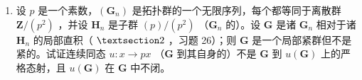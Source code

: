\begin{enumerate}
\def\labelenumi{\arabic{enumi})}
\setcounter{enumi}{22}
\tightlist
\item
  设 \(p\) 是一个素数，\((\mathbf{G}_n)\) 是拓扑群的一个无限序列，每个都等同于离散群 \(\mathbf{Z}/(p^2)\) ，并设 \(\mathbf{H}_n\) 是子群 \((p) / (p^2)\) （\(\mathbf{G}_n\) 的）。设 \(\mathbf{G}\) 是诸 \(\mathbf{G}_n\) 相对于诸 \(\mathbf{H}_n\) 的局部直积（ \(\S 2\) ，习题 26）；则 \(\mathbf{G}\) 是一个局部紧群但不是紧的。试证连续同态 \(u: x \to px\) （\(\mathbf{G}\) 到其自身的）不是 \(\mathbf{G}\) 到 \(u(\mathbf{G})\) 上的严格态射，且 \(u(\mathbf{G})\) 在 \(\mathbf{G}\) 中不闭。
\end{enumerate}
\relax{}
